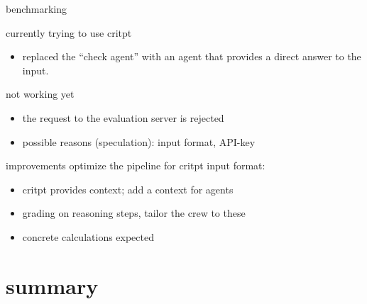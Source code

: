 \documentclass[t]{beamer}
\numberwithin{equation}{section}
\begin{document}
\begin{frame}[c]{benchmarking}
\begin{minipage}{0.11 \linewidth}
		\end{minipage}
		\hfill
		\begin{minipage}{0.80\linewidth}
			currently trying to use critpt\autocite{critPtArx}
			\begin{itemize}
				\item replaced the \enquote {check agent} with an agent that provides a direct answer to the input.
			\end{itemize}\pause
			\begin{alertblock}{not working yet}
				\begin{itemize}
					\item the request to the evaluation server is rejected
					\item possible reasons (speculation): input format, API-key
				\end{itemize}
			\end{alertblock}
			\pause
			\begin{block}{improvements}
				optimize the pipeline for critpt input format: 
				\begin{itemize}
					\item critpt provides context; add a context for agents
					\item grading on reasoning steps, tailor the crew to these
					\item concrete calculations expected
				\end{itemize}
			\end{block}
		\end{minipage}
	\end{frame}
	
	\section{summary}
	
\end{document}

